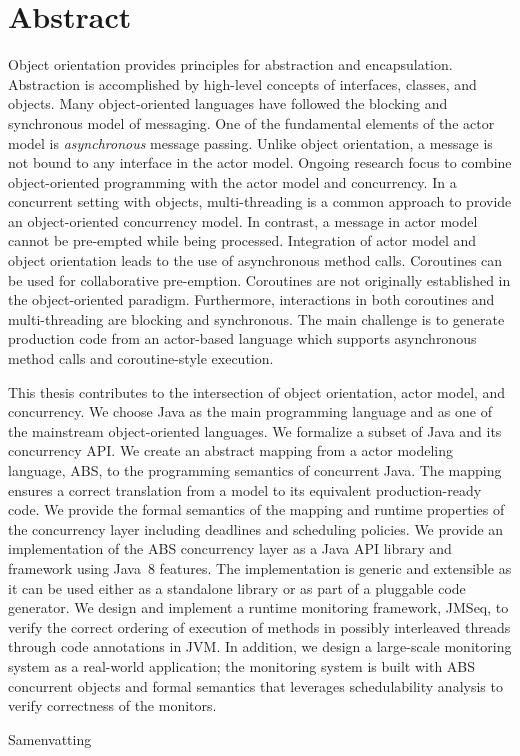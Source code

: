%
\chapter*{Abstract}
\label{sec:abstract}
\vspace*{-10mm}

Object orientation provides principles for abstraction and encapsulation.
Abstraction is accomplished by high-level concepts of interfaces, classes, and objects.
Many object-oriented languages have followed the blocking and synchronous model of messaging. 
One of the fundamental elements of the actor model is \emph{asynchronous} message passing.
Unlike object orientation, a message is not bound to any interface in the actor model.
Ongoing research focus to combine object-oriented programming with the actor model and concurrency.
In a concurrent setting with objects, multi-threading is a common approach to provide an object-oriented concurrency model.
In contrast, a message in actor model cannot be pre-empted while being processed.
Integration of actor model and object orientation leads to the use of asynchronous method calls.
Coroutines can be used for collaborative pre-emption.
Coroutines are not originally established in the object-oriented paradigm.
Furthermore, interactions in both coroutines and multi-threading are blocking and synchronous.
The main challenge is to generate production code from an actor-based language which supports asynchronous method calls and coroutine-style execution.

This thesis contributes to the intersection of object orientation, actor model, and concurrency.
We choose Java as the main programming language and as one of the mainstream 
object-oriented languages. 
We formalize a subset of Java and its concurrency API.
We create an abstract mapping from a actor modeling language, ABS, to the programming semantics of concurrent Java. 
The mapping ensures a correct translation from a model to its equivalent production-ready code.
We provide the formal semantics of the mapping and runtime properties of 
the concurrency layer including deadlines and scheduling policies.
We provide an implementation of the ABS concurrency layer as a Java API library and framework using Java~8 features.
The implementation is generic and extensible as it can be used either as a standalone library or as part of a pluggable code generator.
We design and implement a runtime monitoring framework, JMSeq, to verify the
correct ordering of execution of methods in possibly interleaved threads through code annotations in JVM. 
In addition, we design a large-scale monitoring system as a real-world 
application; the monitoring system is built with ABS concurrent objects 
and formal semantics that leverages schedulability analysis to verify correctness of the monitors.

\vspace*{20mm}

{Samenvatting}\label{sec:abstract-diff} \\

